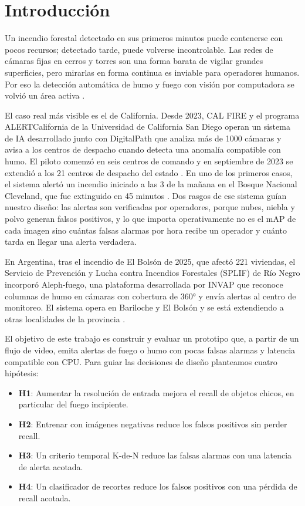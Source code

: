 \documentclass[conference,a4paper]{IEEEtran}
\begin{document}
\section{Introducción}

Un incendio forestal detectado en sus primeros minutos puede contenerse con pocos recursos; detectado tarde, puede volverse incontrolable. Las redes de cámaras fijas en cerros y torres son una forma barata de vigilar grandes superficies, pero mirarlas en forma continua es inviable para operadores humanos. Por eso la detección automática de humo y fuego con visión por computadora se volvió un área activa \cite{jin2023videofire}.

El caso real más visible es el de California. Desde 2023, CAL FIRE y el programa ALERTCalifornia de la Universidad de California San Diego operan un sistema de IA desarrollado junto con DigitalPath que analiza más de \num{1000} cámaras y avisa a los centros de despacho cuando detecta una anomalía compatible con humo. El piloto comenzó en seis centros de comando y en septiembre de 2023 se extendió a los 21 centros de despacho del estado \cite{alertca2023time}. En uno de los primeros casos, el sistema alertó un incendio iniciado a las 3 de la mañana en el Bosque Nacional Cleveland, que fue extinguido en 45 minutos \cite{reuters2023california}. Dos rasgos de ese sistema guían nuestro diseño: las alertas son verificadas por operadores, porque nubes, niebla y polvo generan falsos positivos, y lo que importa operativamente no es el mAP de cada imagen sino cuántas falsas alarmas por hora recibe un operador y cuánto tarda en llegar una alerta verdadera.

En Argentina, tras el incendio de El Bolsón de 2025, que afectó 221 viviendas, el Servicio de Prevención y Lucha contra Incendios Forestales (SPLIF) de Río Negro incorporó Aleph-fuego, una plataforma desarrollada por INVAP que reconoce columnas de humo en cámaras con cobertura de \ang{360} y envía alertas al centro de monitoreo. El sistema opera en Bariloche y El Bolsón y se está extendiendo a otras localidades de la provincia \cite{rionegro_splif_ia,diarioneuquino2026aleph}.

El objetivo de este trabajo es construir y evaluar un prototipo que, a partir de un flujo de video, emita alertas de fuego o humo con pocas falsas alarmas y latencia compatible con CPU. Para guiar las decisiones de diseño planteamos cuatro hipótesis:

\begin{itemize}
\item \textbf{H1}: Aumentar la resolución de entrada mejora el recall de objetos chicos, en particular del fuego incipiente.
\item \textbf{H2}: Entrenar con imágenes negativas reduce los falsos positivos sin perder recall.
\item \textbf{H3}: Un criterio temporal K-de-N reduce las falsas alarmas con una latencia de alerta acotada.
\item \textbf{H4}: Un clasificador de recortes reduce los falsos positivos con una pérdida de recall acotada.
\end{itemize}
\end{document}
